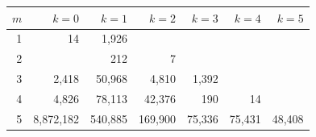 \begin{tabular}{rrrrrrr}
\toprule
$m$ & $k=0$ & $k=1$ & $k=2$ & $k=3$ & $k=4$ & $k=5$ \\
\midrule
1 & 14 & 1,926 &  &  &  &  \\
2 &  & 212 & 7 &  &  &  \\
3 & 2,418 & 50,968 & 4,810 & 1,392 &  &  \\
4 & 4,826 & 78,113 & 42,376 & 190 & 14 &  \\
5 & 8,872,182 & 540,885 & 169,900 & 75,336 & 75,431 & 48,408 \\
\bottomrule
\end{tabular}
